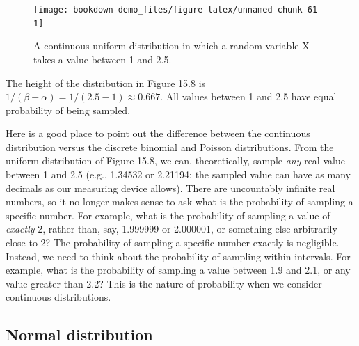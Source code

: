 \documentclass[
]{scrbook}
\begin{document}
\begin{figure}
\texttt{[image: bookdown-demo\_files/figure-latex/unnamed-chunk-61-1]} \caption{A continuous uniform distribution in which a random variable X takes a value between 1 and 2.5.}\label{fig:unnamed-chunk-61}
\end{figure}

The height of the distribution in Figure 15.8 is \(1/(\beta - \alpha) = 1/(2.5 - 1) \approx 0.667\).
All values between 1 and 2.5 have equal probability of being sampled.

Here is a good place to point out the difference between the continuous distribution versus the discrete binomial and Poisson distributions.
From the uniform distribution of Figure 15.8, we can, theoretically, sample \emph{any} real value between 1 and 2.5 (e.g., 1.34532 or 2.21194; the sampled value can have as many decimals as our measuring device allows).
There are uncountably infinite real numbers, so it no longer makes sense to ask what is the probability of sampling a specific number.
For example, what is the probability of sampling a value of \emph{exactly} 2, rather than, say, 1.999999 or 2.000001, or something else arbitrarily close to 2?
The probability of sampling a specific number exactly is negligible.
Instead, we need to think about the probability of sampling within intervals.
For example, what is the probability of sampling a value between 1.9 and 2.1, or any value greater than 2.2?
This is the nature of probability when we consider continuous distributions.

\hypertarget{normal-distribution}{%
\subsection{Normal distribution}\label{normal-distribution}}
\end{document}
